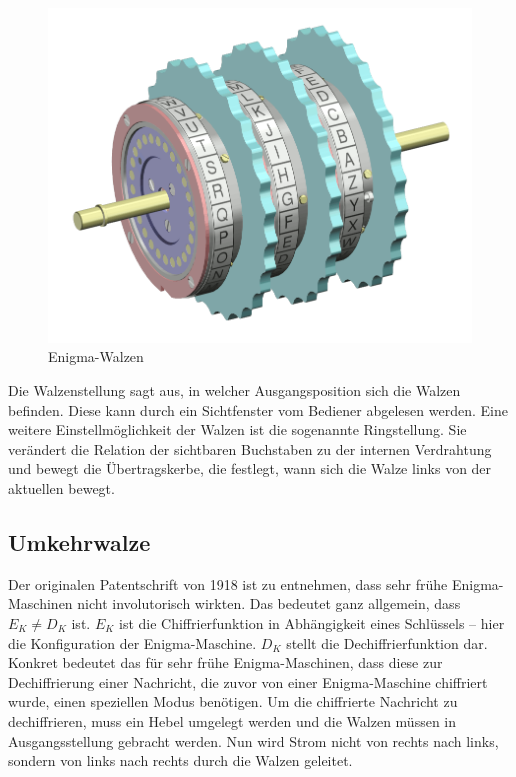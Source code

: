 \begin{figure}[htbp]
	\centering
	\includegraphics[width=.4\linewidth]{Enigma/Enigma-rotor-set}
	\caption{Enigma-Walzen\autocite{enigmarotorset2004}}
	\label{fig:enigma_rotors}
\end{figure}

Die Walzenstellung sagt aus, in welcher Ausgangsposition sich die Walzen befinden.
Diese kann durch ein Sichtfenster vom Bediener abgelesen werden.
Eine weitere Einstellmöglichkeit der Walzen ist die sogenannte Ringstellung.
Sie verändert die Relation der sichtbaren Buchstaben zu der internen Verdrahtung und bewegt die Übertragskerbe, %
die festlegt, wann sich die Walze links von der aktuellen bewegt.


\newpage
\subsection{Umkehrwalze}\label{subsec:umkehrwalze}
Der originalen Patentschrift\autocite{scherbiuschiffriermaschine1925} von 1918 ist zu entnehmen, dass sehr frühe Enigma-Maschinen nicht involutorisch wirkten.
Das bedeutet ganz allgemein, dass $E_K \ne D_K$ ist.
$E_K$ ist die Chiffrierfunktion in Abhängigkeit eines Schlüssels – hier die Konfiguration der Enigma-Maschine.
$D_K$ stellt die Dechiffrierfunktion dar.
Konkret bedeutet das für sehr frühe Enigma-Maschinen, dass diese zur Dechiffrierung einer Nachricht, die zuvor von einer Enigma-Maschine chiffriert wurde, einen speziellen Modus benötigen.
Um die chiffrierte Nachricht zu dechiffrieren, muss ein Hebel umgelegt werden und die Walzen müssen in Ausgangsstellung gebracht werden.
Nun wird Strom nicht von rechts nach links, sondern von links nach rechts durch die Walzen geleitet.

